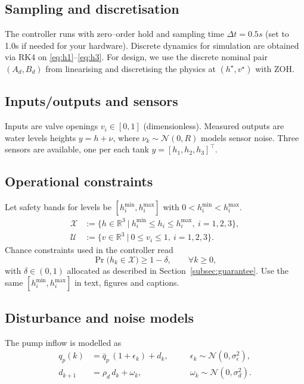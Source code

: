 \documentclass[10pt]{article}
\newcommand{\1}{\mathbbm{1}}
\begin{document}
\subsection{Sampling and discretisation}\label{subsec:sampling}
The controller runs with zero–order hold and sampling time \(\Delta t={0.5}{s}\) (set to {1.0}{s} if needed for your hardware). Discrete dynamics for simulation are obtained via RK4 on \eqref{eq:h1}–\eqref{eq:h3}. For design, we use the discrete nominal pair \((A_d,B_d)\) from linearising and discretising the physics at \((h^\star,v^\star)\) with ZOH.

\subsection{Inputs/outputs and sensors}\label{subsec:io}
Inputs are valve openings \(v_i\in[0,1]\) (dimensionless).  
Measured outputs are water levels  heights \(y=h+\nu\), where \(\nu_k\sim\mathcal N(0,R)\) models sensor noise. Three sensors are available, one per each tank \(y=[h_1,h_2,h_3]^\top\).

\subsection{Operational constraints}\label{subsec:constraints}
Let safety bands for levels be \([h_i^{\min},h_i^{\max}]\) with \(0<h_i^{\min}<h_i^{\max}\).
\begin{align}
\mathcal X &:= \big\{ h\in\mathbb R^3 \ \big|\ h_i^{\min}\le h_i \le h_i^{\max},\ i=1,2,3 \big\}, \\
\mathcal U &:= \big\{ v\in\mathbb R^3 \ \big|\ 0 \le v_i \le 1,\ i=1,2,3 \big\}.
\end{align}
Chance constraints used in the controller read
\begin{equation}
\Pr\!\big(h_k \in \mathcal X\big) \ge 1-\delta,\qquad \forall k\ge 0,
\end{equation}
with \(\delta\in(0,1)\) allocated as described in Section~\ref{subsec:guarantee}. Use the same \([h_i^{\min},h_i^{\max}]\) in text, figures and captions.

\subsection{Disturbance and noise models}\label{subsec:disturbance}
The pump inflow is modelled as
\begin{equation}
\begin{aligned}
q_p(k) &= \bar q_p\,(1+\epsilon_k) + d_k, 
\quad &&\epsilon_k \sim \mathcal N(0,\sigma_\epsilon^2),\\
d_{k+1} &= \rho_d\, d_k + \omega_k, 
\quad &&\omega_k \sim \mathcal N(0,\sigma_d^2).
\end{aligned}
\label{eq:qp_disturbance}
\end{equation}
\end{document}
